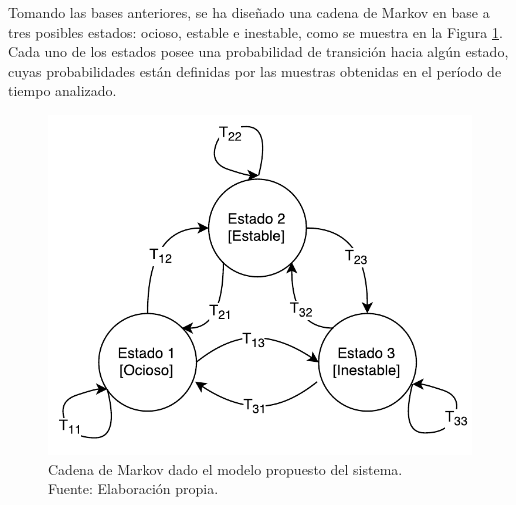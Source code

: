 Tomando las bases anteriores, se ha dise\~nado una cadena de Markov en base a tres posibles estados: ocioso, estable e inestable, como se muestra en la Figura \ref{fig:cadenaMarkovPredictiva}. Cada uno de los estados posee una probabilidad de transici\'on hacia alg\'un estado, cuyas probabilidades est\'an definidas por las muestras obtenidas en el per\'iodo de tiempo analizado.

\begin{figure}[ht!]
  \centering
  \captionsetup{justification=centering}
    \includegraphics[scale=0.75]{images/CadenaMarkovPredictiva.pdf}
  \caption[Cadena de Markov dado el modelo propuesto del sistema.]{Cadena de Markov dado el modelo propuesto del sistema.\\Fuente: Elaboraci\'on propia.}
  \label{fig:cadenaMarkovPredictiva}
\end{figure}


